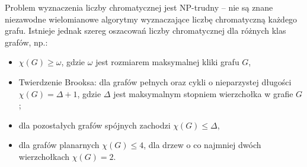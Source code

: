 Problem wyznaczenia liczby chromatycznej jest NP-trudny
– nie są znane niezawodne wielomianowe algorytmy wyznaczające liczbę chromatyczną każdego grafu.
Istnieje jednak szereg oszacowań liczby chromatycznej dla różnych klas grafów, np.:

\begin{itemize}[itemsep=0pt,partopsep=0pt, parsep=0pt]
    \item $\chi (G)\geqslant \omega$, gdzie $\omega$  jest rozmiarem maksymalnej kliki grafu $G$,
    \item Twierdzenie Brooksa: dla grafów pełnych oraz cykli o nieparzystej długości $\chi (G)=\Delta +1$,
    gdzie $\Delta$  jest maksymalnym stopniem wierzchołka w grafie $G$;
    \item dla pozostałych grafów spójnych zachodzi $ \chi (G)\leqslant \Delta$,
    \item dla grafów planarnych  $\chi (G)\leqslant 4$, dla drzew o co najmniej dwóch wierzchołkach $\chi (G)=2$.
\end{itemize}
